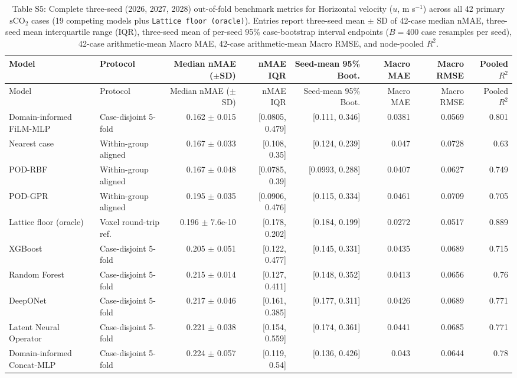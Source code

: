 \begin{landscape}\scriptsize
\begin{longtable}{p{3.8cm}p{2.9cm}rrrrrr}
\caption{Table S5: Complete three-seed (2026, 2027, 2028) out-of-fold benchmark metrics for Horizontal velocity ($u$, m s$^{-1}$) across all 42 primary $\mathrm{sCO}_2$ cases (19 competing models plus \texttt{Lattice floor (oracle)}). Entries report three-seed mean $\pm$ SD of 42-case median nMAE, three-seed mean interquartile range (IQR), three-seed mean of per-seed 95\% case-bootstrap interval endpoints ($B=400$ case resamples per seed), 42-case arithmetic-mean Macro MAE, 42-case arithmetic-mean Macro RMSE, and node-pooled $R^2$.}\\
\toprule Model & Protocol & Median nMAE ($\pm$SD) & nMAE IQR & Seed-mean 95\% Boot. & Macro MAE & Macro RMSE & Pooled $R^2$\\
\midrule\endfirsthead
\toprule Model & Protocol & Median nMAE ($\pm$SD) & nMAE IQR & Seed-mean 95\% Boot. & Macro MAE & Macro RMSE & Pooled $R^2$\\
\midrule\endhead
Domain-informed FiLM-MLP & Case-disjoint 5-fold & 0.162 $\pm$ 0.015 & [0.0805, 0.479] & [0.111, 0.346] & 0.0381 & 0.0569 & 0.801 \\
Nearest case & Within-group aligned & 0.167 $\pm$ 0.033 & [0.108, 0.35] & [0.124, 0.239] & 0.047 & 0.0728 & 0.63 \\
POD-RBF & Within-group aligned & 0.167 $\pm$ 0.048 & [0.0785, 0.39] & [0.0993, 0.288] & 0.0407 & 0.0627 & 0.749 \\
POD-GPR & Within-group aligned & 0.195 $\pm$ 0.035 & [0.0906, 0.476] & [0.115, 0.334] & 0.0461 & 0.0709 & 0.705 \\
Lattice floor (oracle) & Voxel round-trip ref. & 0.196 $\pm$ 7.6e-10 & [0.178, 0.202] & [0.184, 0.199] & 0.0272 & 0.0517 & 0.889 \\
XGBoost & Case-disjoint 5-fold & 0.205 $\pm$ 0.051 & [0.122, 0.477] & [0.145, 0.331] & 0.0435 & 0.0689 & 0.715 \\
Random Forest & Case-disjoint 5-fold & 0.215 $\pm$ 0.014 & [0.127, 0.411] & [0.148, 0.352] & 0.0413 & 0.0656 & 0.76 \\
DeepONet & Case-disjoint 5-fold & 0.217 $\pm$ 0.046 & [0.161, 0.385] & [0.177, 0.311] & 0.0426 & 0.0689 & 0.771 \\
Latent Neural Operator & Case-disjoint 5-fold & 0.221 $\pm$ 0.038 & [0.154, 0.559] & [0.174, 0.361] & 0.0441 & 0.0685 & 0.771 \\
Domain-informed Concat-MLP & Case-disjoint 5-fold & 0.224 $\pm$ 0.057 & [0.119, 0.54] & [0.136, 0.426] & 0.043 & 0.0644 & 0.78 \\

\end{longtable}
\end{landscape}
